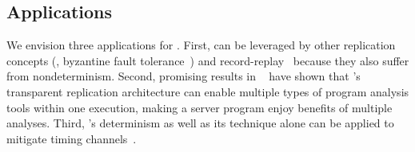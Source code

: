 \subsection{Applications} \label{sec:app}

We envision three applications for \xxx. First, \xxx can 
be leveraged by other replication concepts (\eg, byzantine fault 
tolerance~\cite{pbft:osdi99, zyzzyva:sosp07}) 
and record-replay~\cite{scribe:sigmetrics10, racepro:sosp11, respec:asplos10} 
because they also suffer from nondeterminism. Second, promising 
results in \repframe~\cite{repframe:apsys15} have shown that \xxx's transparent 
replication architecture can enable multiple types of program analysis tools 
within one execution, making a server program enjoy benefits of multiple 
analyses. Third, \xxx's determinism as well as its \timealgo technique alone can 
be applied to mitigate timing channels~\cite{Askarov:ccs10, Zhang:ccs11, 
Aviram:ccsw10}.